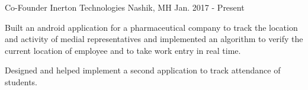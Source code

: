 
\begin{cventries}
  
    \cventry
    {Co-Founder} %
    {Inerton Technologies} %
    {Nashik, MH} %
    {Jan. 2017 - Present} %
    {
      \begin{cvitems} %
        \item {Built an android application for a pharmaceutical company to track the location and activity of medial representatives and implemented an algorithm to verify the current location of employee and to take work entry in real time. }
		\item {Designed and helped implement a second application to track attendance of students.}
      \end{cvitems}
    }
  
\end{cventries}
